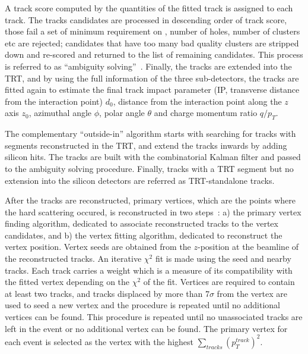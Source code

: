 A track score computed by the quantities of the fitted track
is assigned to each track.
The tracks candidates are processed in descending order of 
track score,
those fail a set of minimum requirement on \pt, number of holes, 
number of clusters etc are rejected;
candidates that have too many bad quality clusters are 
stripped down and re-scored and returned to the list
of remaining candidates.
This process is referred to as ``ambiguity solving''~\cite{PERF-2015-08}.
Finally, the tracks are extended into the TRT, and by using the full information
of the three sub-detectors, the tracks are fitted again to estimate the final track
impact parameter (IP, transverse distance from the interaction point) $d_0$, 
distance from the interaction point along the $z$ axis $z_0$,
azimuthal angle $\phi$, polar angle $\theta$ and charge momentum ratio $q/p_T$.

The complementary ``outside-in'' algorithm starts with searching for tracks with segments 
reconstructed in the TRT, and extend the tracks inwards by adding silicon hits.
The tracks are built with the combinatorial Kalman filter and passed to the
ambiguity solving procedure.
Finally, tracks with a TRT segment but no extension into the silicon detectors
are referred as TRT-standalone tracks. 

After the tracks are reconstructed, primary vertices,
which are the points where the hard scattering occured,
is reconstructed in two steps~\cite{ATLAS-CONF-2010-069}:
a) the primary vertex finding algorithm, 
dedicated to associate reconstructed tracks to the vertex candidates, 
and b) the vertex fitting algorithm, 
dedicated to reconstruct the vertex position. 
Vertex seeds are obtained from the $z$-position at the beamline of the reconstructed tracks. 
An iterative $\chi^2$ fit is made using the seed and nearby tracks. 
Each track carries a weight which is a measure of its compatibility 
with the fitted vertex depending on the $\chi^2$ of the fit. 
Vertices are required to contain at least two tracks, and 
tracks displaced by more than 7$\sigma$ from the vertex are used to
seed a new vertex and the procedure is repeated until no additional vertices can be found. 
This procedure is repeated until no unassociated tracks are left in the event or no
additional vertex can be found. 
The primary vertex for each event is selected as the vertex with the highest
$\sum_{tracks}(p_T^{track})^2$.


